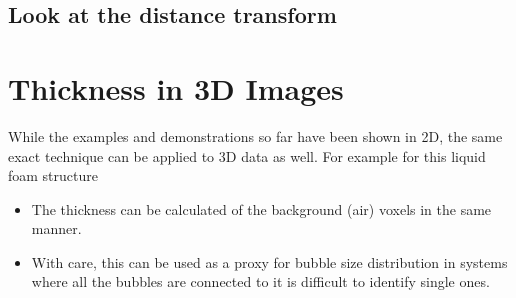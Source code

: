 \documentclass[letterpaper,10pt,english]{sphinxmanual}
\begin{document}
\section{Look at the distance transform}
\label{\detokenize{06-AdvancedShapeAndTexture:look-at-the-distance-transform}}
\begin{sphinxVerbatim}[commandchars=\\\{\}]
  
       
\PYG{p}{[}\PYG{p}{]} 
 \PYG{p}{[}\PYG{p}{]} 
\end{sphinxVerbatim}

\noindent{}


\chapter{Thickness in 3D Images}
\label{\detokenize{06-AdvancedShapeAndTexture:thickness-in-3d-images}}
\sphinxAtStartPar
While the examples and demonstrations so far have been shown in 2D, the same exact technique can be applied to 3D data as well. For example for this liquid foam structure


\begin{itemize}
\item {} 
\sphinxAtStartPar
The thickness can be calculated of the background (air) voxels in the same manner.

\item {} 
\sphinxAtStartPar
With care, this can be used as a proxy for bubble size distribution in systems where all the bubbles are connected to it is difficult to identify single ones.

\end{itemize}
\end{document}

